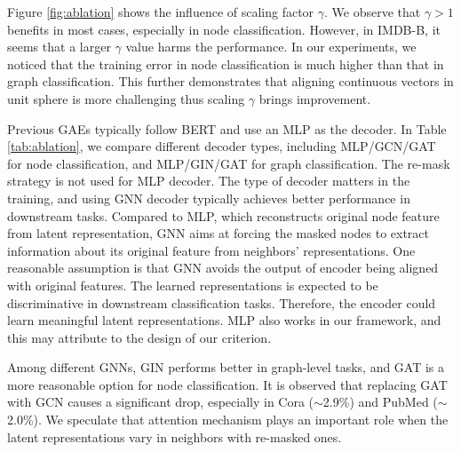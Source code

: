 {Figure \ref{fig:ablation} shows the influence of scaling factor $\gamma$.  We observe that $\gamma > 1$ benefits in most cases, especially in node classification. However, in IMDB-B, it seems that a larger $\gamma$ value harms the performance. In our experiments, we noticed that the training error in node classification is much higher than that in graph classification. This further demonstrates that aligning continuous vectors in unit sphere is more challenging thus scaling $\gamma$ brings improvement. 


 Previous GAEs typically follow BERT and use an MLP as the decoder. In Table \ref{tab:ablation}, we compare different decoder types, including MLP/GCN/GAT for node classification, and MLP/GIN/GAT for graph classification. The re-mask strategy is not used for MLP decoder.  The type of decoder matters in the training, and using GNN decoder typically achieves better performance in downstream tasks. Compared to MLP, which reconstructs original node feature from latent representation, GNN aims at forcing the masked nodes to extract information about its original feature from neighbors' representations. One reasonable assumption is that GNN avoids the output of encoder being aligned with original features. The learned representations is expected to be discriminative in downstream classification tasks. Therefore, the encoder could learn meaningful latent representations. MLP also works in our framework, and this may attribute to the design of our criterion.

Among different GNNs, GIN performs better in graph-level tasks, and GAT is a more reasonable option for node classification. It is observed that replacing GAT with GCN causes a significant drop, especially in Cora ($\sim$2.9\%) and PubMed ($\sim$2.0\%). We speculate that attention mechanism plays an important role when the latent representations vary in neighbors with re-masked ones.



\begin{table}[htbp]
\caption{Ablation study of decoder type, re-mask and reconstruction criterion on node- and graph-level benchmarks.}
\label{tab:ablation}
\renewcommand\tabcolsep{4pt}


\end{table}}
